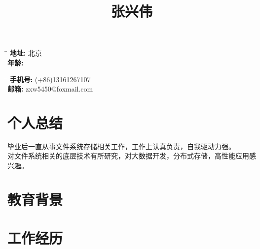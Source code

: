 \documentclass[10pt]{article} %
\begin{document}
\title{张兴伟}
\parbox{2pt}{
\begin{tabbing}
\hspace{1.5cm} \= \hspace{4cm} \kill %
\textbf{地址:} \>北京\\
\textbf{年龄:} 
\end{tabbing}
}
\hfill %
\parbox{2pt}{
\begin{tabbing}
\hspace{1.5cm} \= \hspace{4cm} \kill %
\textbf{手机号:} \>(+86)13161267107\\ 
\textbf{邮箱:} \>zxw5450@foxmail.com
\end{tabbing}
}

\section{个人总结}
毕业后一直从事文件系统存储相关工作，工作上认真负责，自我驱动力强。\\对文件系统相关的底层技术有所研究，对大数据开发，分布式存储，高性能应用感兴趣。
\section{教育背景}
\section{工作经历}
\end{document}
